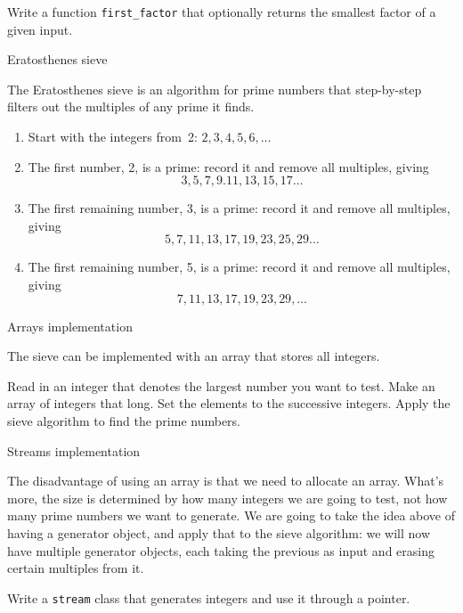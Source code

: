 \begin{exercise}
  \label{ex:primeoptfact}
  Write a function \lstinline+first_factor+ that optionally
  returns the smallest factor of a given input.
\end{exercise}

 {Eratosthenes sieve}

The Eratosthenes sieve is an algorithm for prime numbers that
step-by-step filters out the multiples of any prime it finds.
\begin{enumerate}
\item Start with the integers from~2: $2,3,4,5,6,\ldots$
\item The first number, 2, is a prime: record it and remove all
  multiples, giving
  \[ 3,5,7,9.11,13,15,17\dots \]
\item The first remaining number, 3, is a prime: record it and remove
  all multiples, giving
  \[ 5,7,11,13,17,19,23,25,29\ldots \]
\item The first remaining number, 5, is a prime: record it and remove
  all multiples, giving
  \[ 7,11,13,17,19,23,29,\ldots \]
\end{enumerate}

 {Arrays implementation}
\label{sec:arraysieve}

The sieve can be implemented with an array that stores all integers.

\begin{exercise}
  \label{ex:arraysieve}
  Read in an integer that denotes the largest number you want to test.
  Make an array of integers that long. Set the elements to the
  successive integers. Apply the sieve algorithm to find the prime numbers.
\end{exercise}

 {Streams implementation}
\label{sec:streamsieve}

The disadvantage of using an array is that we need to allocate
an array. What's more, the size is determined by how many integers we
are going to test, not how many prime numbers we want to generate.
We are going to take the idea above of having a generator object, and
apply that to the sieve algorithm: we will now have multiple generator
objects, each taking the previous as input and erasing certain
multiples from it.

\begin{exercise}
  Write a \lstinline{stream} class that generates integers and use it through
  a pointer.
\end{exercise}

